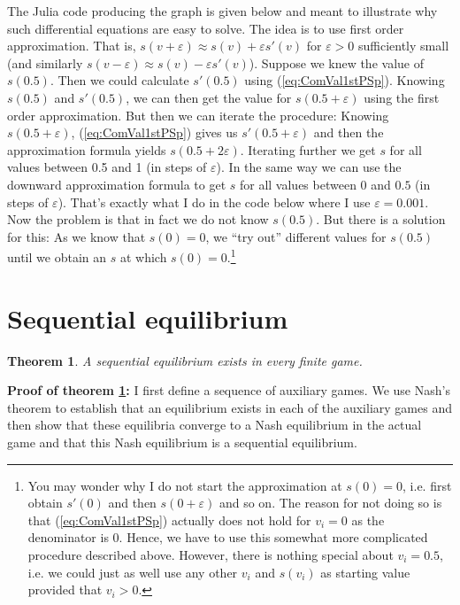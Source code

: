 \documentclass[a4paper,11pt]{article}
\newtheorem{theorem}{Theorem}
\begin{document}
The Julia code producing the graph is given below and meant to illustrate why such differential equations are easy to solve. The idea is to use first order approximation. That is, $s(v+\varepsilon )\approx s(v)+\varepsilon s'(v)$ for $\varepsilon >0$ sufficiently small (and similarly $s(v-\varepsilon )\approx s(v)-\varepsilon s'(v)$). Suppose we knew the value of $s(0.5)$. Then we could calculate $s'(0.5)$ using (\ref{eq:ComVal1stPSp}). Knowing $s(0.5)$ and $s'(0.5)$, we can then get the value for $s(0.5+\varepsilon )$ using the first order approximation. But then we can iterate the procedure: Knowing $s(0.5+\varepsilon )$, (\ref{eq:ComVal1stPSp}) gives us $s'(0.5+\varepsilon )$ and then the approximation formula yields $s(0.5+2\varepsilon )$. Iterating further we get $s$ for all values between 0.5 and 1 (in steps of $\varepsilon $). In the same way we can use the downward approximation formula to get $s$ for all values between 0 and $0.5$ (in steps of $\varepsilon $). That's exactly what I do in the code below where I use $\varepsilon =0.001$. Now the problem is that in fact we do not know $s(0.5)$. But there is a solution for this: As we know that $s(0)=0$, we ``try out'' different values for $s(0.5)$ until we obtain an $s$ at which $s(0)=0$.\footnote{You may wonder why I do not start the approximation at $s(0)=0$, i.e. first obtain $s'(0)$ and then $s(0+\varepsilon )$ and so on. The reason for not doing so is that (\ref{eq:ComVal1stPSp}) actually does not hold for $v_i=0$ as the denominator is 0. Hence, we have to use this somewhat more complicated procedure described above. However, there is nothing special about $v_i=0.5$, i.e. we could just as well use any other $v_i$ and $s(v_i)$ as starting value provided that $v_i>0$. }



\section{Sequential equilibrium}
\label{sec:sequ-equil}

\begin{theorem}\label{thm:seqEqExistence}
A sequential equilibrium exists in every finite game.
\end{theorem}
\textbf{Proof of theorem \ref{thm:seqEqExistence}: }I first define a sequence of auxiliary games. We use Nash's theorem to establish that an equilibrium exists in each of the auxiliary games and then show that these equilibria converge to a Nash equilibrium in the actual game and that this Nash equilibrium is a sequential equilibrium.
\end{document}
